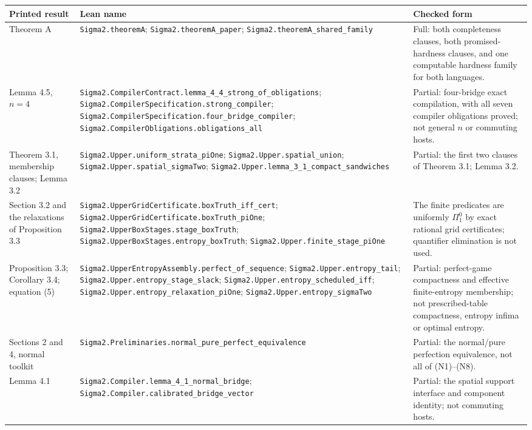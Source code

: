 \begin{center}\footnotesize
\begin{minipage}{\linewidth}
\setlength{\tabcolsep}{4pt}
\begin{tabular}{@{}>{\raggedright\arraybackslash}p{.17\linewidth}>{\raggedright\arraybackslash}p{.44\linewidth}>{\raggedright\arraybackslash}p{.33\linewidth}@{}}
\toprule Printed result & Lean name & Checked form\\\midrule
Theorem A &
\nolinkurl{Sigma2.theoremA};
\nolinkurl{Sigma2.theoremA_paper};
\nolinkurl{Sigma2.theoremA_shared_family} &
Full: both completeness clauses, both promised-hardness clauses, and one
computable hardness family for both languages.\\[4pt]
Lemma 4.5, $n=4$ &
\nolinkurl{Sigma2.CompilerContract.lemma_4_4_strong_of_obligations};
\nolinkurl{Sigma2.CompilerSpecification.strong_compiler};
\nolinkurl{Sigma2.CompilerSpecification.four_bridge_compiler};
\nolinkurl{Sigma2.CompilerObligations.obligations_all} &
Partial: four-bridge exact compilation, with all seven compiler
obligations proved; not general $n$ or commuting hosts.\\[4pt]
Theorem 3.1, membership clauses; Lemma 3.2 &
\nolinkurl{Sigma2.Upper.uniform_strata_piOne};
\nolinkurl{Sigma2.Upper.spatial_union};
\nolinkurl{Sigma2.Upper.spatial_sigmaTwo};
\nolinkurl{Sigma2.Upper.lemma_3_1_compact_sandwiches} &
Partial: the first two clauses of Theorem 3.1; Lemma 3.2.\\[4pt]
Section 3.2 and the relaxations of Proposition 3.3 &
\nolinkurl{Sigma2.UpperGridCertificate.boxTruth_iff_cert};
\nolinkurl{Sigma2.UpperGridCertificate.boxTruth_piOne};
\nolinkurl{Sigma2.UpperBoxStages.stage_boxTruth};
\nolinkurl{Sigma2.UpperBoxStages.entropy_boxTruth};
\nolinkurl{Sigma2.Upper.finite_stage_piOne} &
The finite predicates are uniformly $\Pi^0_1$ by exact rational grid
certificates; quantifier elimination is not used.\\[4pt]
Proposition 3.3; Corollary 3.4; equation (5) &
\nolinkurl{Sigma2.UpperEntropyAssembly.perfect_of_sequence};
\nolinkurl{Sigma2.Upper.entropy_tail};
\nolinkurl{Sigma2.Upper.entropy_stage_slack};
\nolinkurl{Sigma2.Upper.entropy_scheduled_iff};
\nolinkurl{Sigma2.Upper.entropy_relaxation_piOne};
\nolinkurl{Sigma2.Upper.entropy_sigmaTwo} &
Partial: perfect-game compactness and effective finite-entropy
membership; not prescribed-table compactness, entropy infima or optimal
entropy.\\[4pt]
Sections 2 and 4, normal toolkit &
\nolinkurl{Sigma2.Preliminaries.normal_pure_perfect_equivalence} &
Partial: the normal/pure perfection equivalence, not all of
(N1)--(N8).\\[4pt]
Lemma 4.1 &
\nolinkurl{Sigma2.Compiler.lemma_4_1_normal_bridge};
\nolinkurl{Sigma2.Compiler.calibrated_bridge_vector} &
Partial: the spatial support interface and component identity; not
commuting hosts.\\
\bottomrule
\end{tabular}
\end{minipage}
\end{center}

